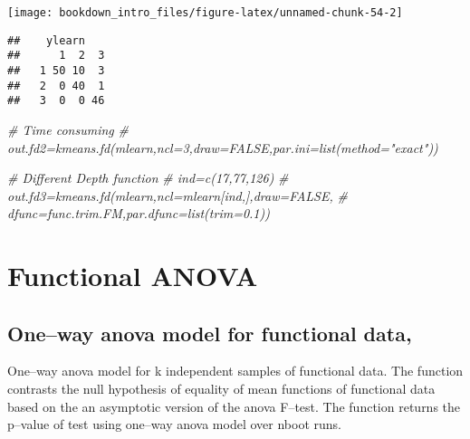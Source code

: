 \documentclass[
]{book}
\newenvironment{Shaded}{\begin{snugshade}}{\end{snugshade}}
\newcommand{\AttributeTok}[1]{\textcolor[rgb]{0.77,0.63,0.00}{#1}}
\newcommand{\CommentTok}[1]{\textcolor[rgb]{0.56,0.35,0.01}{\textit{#1}}}
\newcommand{\ConstantTok}[1]{\textcolor[rgb]{0.00,0.00,0.00}{#1}}
\newcommand{\DecValTok}[1]{\textcolor[rgb]{0.00,0.00,0.81}{#1}}
\newcommand{\FunctionTok}[1]{\textcolor[rgb]{0.00,0.00,0.00}{#1}}
\newcommand{\NormalTok}[1]{#1}
\newcommand{\OtherTok}[1]{\textcolor[rgb]{0.56,0.35,0.01}{#1}}
\newcommand{\SpecialCharTok}[1]{\textcolor[rgb]{0.00,0.00,0.00}{#1}}
\begin{document}
\begin{center}\texttt{[image: bookdown\_intro\_files/figure-latex/unnamed-chunk-54-2]} \end{center}

\begin{Shaded}
\end{Shaded}

\begin{verbatim}
##    ylearn
##      1  2  3
##   1 50 10  3
##   2  0 40  1
##   3  0  0 46
\end{verbatim}

\begin{Shaded}
\begin{Highlighting}[]
\CommentTok{\# Time consuming}
\CommentTok{\# out.fd2=kmeans.fd(mlearn,ncl=3,draw=FALSE,par.ini=list(method="exact"))}

\CommentTok{\# Different Depth function}
\CommentTok{\# ind=c(17,77,126)}
\CommentTok{\# out.fd3=kmeans.fd(mlearn,ncl=mlearn[ind,],draw=FALSE,}
\CommentTok{\# dfunc=func.trim.FM,par.dfunc=list(trim=0.1))}
\end{Highlighting}
\end{Shaded}

\hypertarget{functional-anova}{%
\section{Functional ANOVA}\label{functional-anova}}

\hypertarget{oneway-anova-model-for-functional-data-cuevas2004}{%
\subsection{\texorpdfstring{One--way anova model for functional data, \citet{Cuevas2004}}{One--way anova model for functional data, @Cuevas2004}}\label{oneway-anova-model-for-functional-data-cuevas2004}}

One--way anova model for k independent samples of functional data. The function contrasts the null hypothesis of equality of mean functions of functional data based on the an asymptotic version of the anova F--test. The function returns the p--value of test using one--way anova model over nboot runs.

\begin{Shaded}
\end{Shaded}
\end{document}

